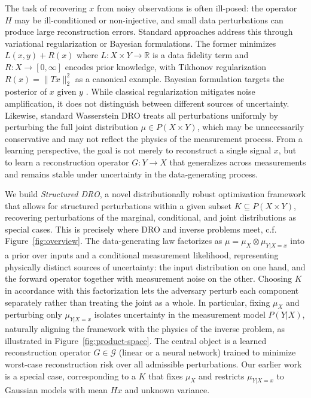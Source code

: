 \documentclass{article}
\newcommand{\R}{\mathbb{R}} %
\theoremstyle{definition}
\theoremstyle{remarksty}
\begin{document}
The task of recovering $x$ from noisy observations is often ill-posed: the operator $H$ may be ill-conditioned or non-injective, and small data perturbations can produce large reconstruction errors. Standard approaches address this through variational regularization or Bayesian formulations. The former minimizes $L(x,y) + R(x)$ where $L: X\times Y\to\R$ is a data fidelity term and $R: X\to[0,\infty]$ encodes prior knowledge, with Tikhonov regularization $R(x)=\|Tx\|_2^2$ as a canonical example. Bayesian formulation targets the posterior of $x$ given $y$ \cite{dashti_bayesian_2017}. While classical regularization mitigates noise amplification, it does not distinguish between different sources of uncertainty. Likewise, standard Wasserstein DRO treats all perturbations uniformly by perturbing the full joint distribution $\mu \in P(X\times Y)$, which may be unnecessarily conservative and may not reflect the physics of the measurement process. From a learning perspective, the goal is not merely to reconstruct a single signal $x$, but to learn a reconstruction operator $G:Y\to X$ that generalizes across measurements and remains stable under uncertainty in the data-generating process. 

We build \emph{Structured DRO}, a novel distributionally robust optimization framework that allows for structured perturbations within a given subset $K \subseteq P(X\times Y)$, recovering perturbations of the marginal, conditional, and joint distributions as special cases. This is precisely where DRO and inverse problems meet, c.f. Figure~\ref{fig:overview}. The data-generating law factorizes as $\mu = \mu_X \otimes \mu_{Y|X=x}$ into a prior over inputs and a conditional measurement likelihood, representing physically distinct sources of uncertainty: the input distribution on one hand, and the forward operator together with measurement noise on the other. Choosing $K$ in accordance with this factorization lets the adversary perturb each component separately rather than treating the joint as a whole. In particular, fixing $\mu_X$ and perturbing only $\mu_{Y|X=x}$ isolates uncertainty in the measurement model $P(Y| X)$, naturally aligning the framework with the physics of the inverse problem, as illustrated in Figure~\ref{fig:product-space}. The central object is a learned reconstruction operator $G \in \mathcal{G}$ (linear or a neural network) trained to minimize worst-case reconstruction risk over all admissible perturbations. Our earlier work \cite{van_maarschalkerwaart_perturbation-aware_2025} is a special case, corresponding to a $K$ that fixes $\mu_X$ and restricts $\mu_{Y|X=x}$ to Gaussian models with mean $Hx$ and unknown variance. 
\end{document}
